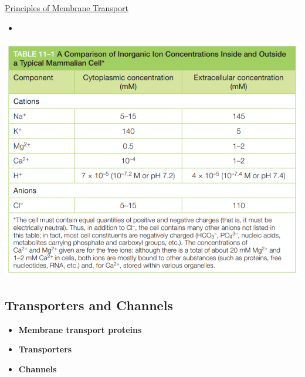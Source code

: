 \documentclass[12pt,letterpaper]{article}
\begin{document}
\hypertarget{11.1}{}
\begin{secbox}{\hyperlink{11}{Principles of Membrane Transport}}{
    \begin{itemize}
        \item 
    \end{itemize}
    \begin{center}
        \includegraphics[scale=0.4]{images/tab11-1.png}
    \end{center}
    \vspace{-1cm} 
    \hypertarget{11.1.1}{\subsection*{Transporters and Channels}}
    \begin{itemize}
        \item \textbf{Membrane transport proteins}
        \item \textbf{Transporters}
        \item \textbf{Channels}
    \end{itemize}

}
\end{secbox}
\end{document}
